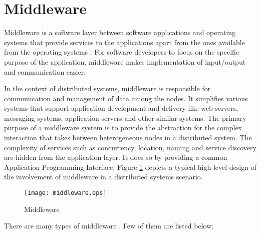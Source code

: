 \section{Middleware}

Middleware is a software layer between software applications and operating systems that provide services to the applications apart from the ones available from the operating systems \parencite{middleware_wiki}. For software developers to focus on the specific purpose of the application, middleware makes implementation of input/output and communication easier.



In the context of distributed systems, middleware is responsible for communication and management of data among the nodes. It simplifies various systems that support application development and delivery like web servers, messaging systems, application servers and other similar systems. The primary purpose of a middleware system is to provide the abstraction for the complex interaction that takes between heterogeneous nodes in a distributed system. The complexity of services such as concurrency, location, naming and service discovery are hidden from the application layer. It does so by providing a common Application Programming  Interface. Figure \ref{figures:middleware} depicts a typical high-level design of the involvement of middleware in a distributed systems scenario.

\makeatletter
\setlength{\@fptop}{0pt}
\makeatother

\begin{figure}[t!]
\centering
\texttt{[image: middleware.eps]}
\caption{Middleware}\label{figures:middleware}
\end{figure}

There are many types of middleware \parencite{middleware_types}. Few of them are listed below:

